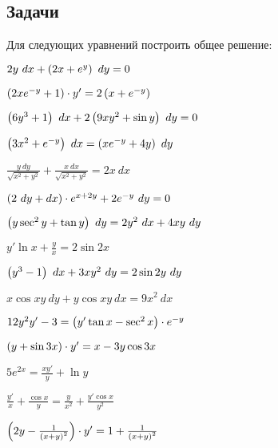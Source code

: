 \subsection{Задачи}
	
	Для следующих уравнений построить общее решение:
	\begin{multicols}{2}
		\begin{enumtasks}

			\label{firstorder:totalderiv}
			\item \( 2y ~ dx + \left( 2x + e^{y} \right) ~ dy = 0 \) 												%
			\item \( \left( 2x e^{-y} + 1 \right) \cdot y' = 2 \left( x + e^{-y} \right) \) 								%
			\item \( \left( 6y^3 + 1 \right) ~ dx + 2\left( 9xy^2 + \sin{y} \right) ~ dy = 0 \) 							%
			\item \( \left( 3x^2 + e^{-y} \right) ~ dx = \left( x e^{-y} + 4y \right) ~ dy \) 							%
			\item \( \frac{y ~ dy}{\sqrt{x^2 + y^2}} + \frac{x ~ dx}{\sqrt{x^2 + y^2}} = 2x ~ dx \) 		%
			\item \( \left( 2 ~ dy + dx \right) \cdot e^{x + 2y} + 2e^{-y} ~ dy = 0 \) 							%
			\item \( \left( y \sec^2{y} + \tan{y} \right) ~ dy = 2y^2 ~ dx + 4xy ~ dy \) 							%
			\item \( y' \ln{x} + \frac{y}{x} = 2 \sin{2x} \) 												%
			\item \( \left( y^3 - 1 \right) ~ dx + 3xy^2 ~ dy = 2 \sin{2y} ~ dy \) 								%
			\item \( x \cos{xy} ~ dy + y \cos{xy} ~ dx = 9x^2 ~ dx \) 										%
			\item \( 12y^2 y' - 3 = \left( y' \tan{x} - \sec^2{x} \right) \cdot e^{-y} \) 							%
			\item \( \left( y + \sin{3x} \right) \cdot y' = x - 3y \cos{3x} \) 									%
			\item \( 5e^{2x} = \frac{xy'}{y} + \ln{y} \) 													%
			\item \( \frac{y'}{x} + \frac{\cos{x}}{y} = \frac{y}{x^2} + \frac{y' \cos{x}}{y^2} \) 			%
			\item \( \left( 2y - \frac{1}{\left( x + y \right)^2} \right) \cdot y' = 1 + \frac{1}{\left( x + y \right)^2} \) 	%

\end{enumtasks}
\end{multicols}
